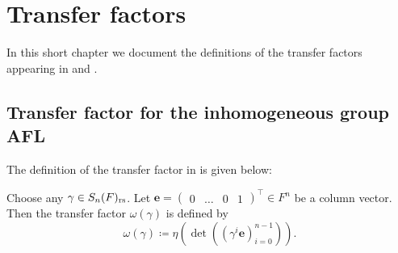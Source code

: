 \chapter{Transfer factors}
\label{ch:transf}

In this short chapter we document the definitions of the transfer
factors appearing in  and .

\section{Transfer factor for the inhomogeneous group AFL}
The definition of the transfer factor in  is given below:
\begin{definition}
  Choose any $\gamma \in S_n(F)_{\mathrm{rs}}$.
  Let $\mathbf{e} = \begin{pmatrix} 0 & \dots & 0 & 1 \end{pmatrix}^\top \in F^n$
  be a column vector.
  Then the transfer factor $\omega(\gamma)$ is defined by
  \[ \omega(\gamma) \coloneqq
    \eta\left( \det\left( \left( \gamma^i \mathbf{e} \right)_{i=0}^{n-1} \right) \right).
  \]
\end{definition}


